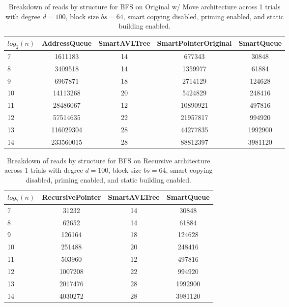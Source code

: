 \begin{table}[]
\centering
\begin{tabular}{|l|c|c|c|c|}
$log_2(n)$ & AddressQueue & SmartAVLTree & SmartPointerOriginal & SmartQueue \\ \hline
7 & 1611183 & 14 & 677343 & 30848 \\ \hline
8 & 3409518 & 14 & 1359977 & 61884 \\ \hline
9 & 6967871 & 18 & 2714129 & 124628 \\ \hline
10 & 14113268 & 20 & 5424829 & 248416 \\ \hline
11 & 28486067 & 12 & 10890921 & 497816 \\ \hline
12 & 57514635 & 22 & 21957817 & 994920 \\ \hline
13 & 116029304 & 28 & 44277835 & 1992900 \\ \hline
14 & 233560015 & 28 & 88812397 & 3981120 \\ \hline
\end{tabular}
\caption{Breakdown of reads by structure for BFS on Original w/ Move architecture across 1 trials with degree $d=100$, block size $bs=64$, smart copying disabled, priming enabled, and static building enabled.}
    \label{tab:reads_by_structure_bfs_d100_bs64_trials1_copiesfalse_primetrue_staticinsertiontrue_ptoriginal_movetrue}
\end{table}

\begin{table}[]
\centering
\begin{tabular}{|l|c|c|c|}
$log_2(n)$ & RecursivePointer & SmartAVLTree & SmartQueue \\ \hline
7 & 31232 & 14 & 30848 \\ \hline
8 & 62652 & 14 & 61884 \\ \hline
9 & 126164 & 18 & 124628 \\ \hline
10 & 251488 & 20 & 248416 \\ \hline
11 & 503960 & 12 & 497816 \\ \hline
12 & 1007208 & 22 & 994920 \\ \hline
13 & 2017476 & 28 & 1992900 \\ \hline
14 & 4030272 & 28 & 3981120 \\ \hline
\end{tabular}
\caption{Breakdown of reads by structure for BFS on Recursive architecture across 1 trials with degree $d=100$, block size $bs=64$, smart copying disabled, priming enabled, and static building enabled.}
    \label{tab:reads_by_structure_bfs_d100_bs64_trials1_copiesfalse_primetrue_staticinsertiontrue_ptrecursive_movetrue}
\end{table}

